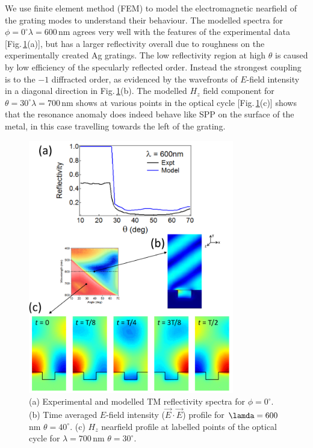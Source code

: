 We use finite element method (FEM) to model the electromagnetic nearfield of the grating modes to understand their behaviour. The modelled spectra for $\phi=0^{\circ} \lambda=600$\,nm agrees very well with the features of the experimental data [Fig.\,\ref{7Fig9}(a)], but has a larger reflectivity overall due to roughness on the experimentally created Ag gratings. The low reflectivity region at high $\theta$ is caused by low efficiency of the specularly reflected order. Instead the strongest coupling is to the $-1$ diffracted order, as evidenced by the wavefronts of $E$-field intensity in a diagonal direction in Fig.\,\ref{7Fig9}(b). The modelled $H_z$ field component for $\theta=30^{\circ} \lambda=700$\,nm shows at various points in the optical cycle [Fig.\,\ref{7Fig9}(c)] shows that the resonance anomaly does indeed behave like SPP on the surface of the metal, in this case travelling towards the left of the grating. 
\begin{figure}[ht] 
\centering    
\includegraphics[width=0.8\textwidth]{Fig9}
\caption{(a) Experimental and modelled TM reflectivity spectra for $\phi=0^{\circ}$. (b) Time averaged $E$-field intensity ($\vec{E}\cdot\vec{E}$) profile for $\lamda=600$\,nm $\theta=40^{\circ}$. (c) $H_z$ nearfield profile at labelled points of the optical cycle for $\lambda=700$\,nm $\theta=30^{\circ}$.}
\label{7Fig9}
\end{figure}


